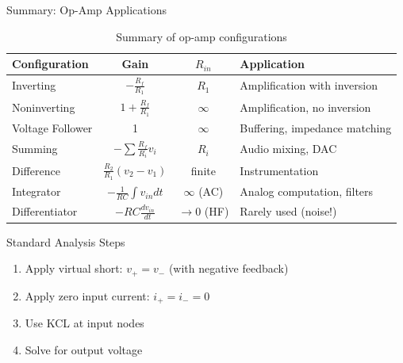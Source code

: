 \documentclass[10pt, aspectratio=169]{beamer}
\begin{document}
\begin{frame}{Summary:  Op-Amp Applications}
    
    \begin{table}
    \centering
    \small
    \begin{tabular}{|l|c|c|l|}
    \hline
    \textbf{Configuration} & \textbf{Gain} & \textbf{$R_{in}$} & \textbf{Application} \\
    \hline
    Inverting & $-\frac{R_f}{R_1}$ & $R_1$ & Amplification with inversion \\
    \hline
    Noninverting & $1 + \frac{R_f}{R_1}$ & $\infty$ & Amplification, no inversion \\
    \hline
    Voltage Follower & 1 & $\infty$ & Buffering, impedance matching \\
    \hline
    Summing & $-\sum \frac{R_f}{R_i}v_i$ & $R_i$ & Audio mixing, DAC \\
    \hline
    Difference & $\frac{R_2}{R_1}(v_2-v_1)$ & finite & Instrumentation \\
    \hline
    Integrator & $-\frac{1}{RC}\int v_{in} dt$ & $\infty$ (AC) & Analog computation, filters \\
    \hline
    Differentiator & $-RC \frac{dv_{in}}{dt}$ & $\to 0$ (HF) & Rarely used (noise!) \\
    \hline
    \end{tabular}
    \caption{Summary of op-amp configurations}
    \end{table}

    \vspace{-0.5cm}

    \begin{block}{Standard Analysis Steps}
        \begin{enumerate}
            \item Apply virtual short:  $v_+ = v_-$ (with negative feedback)
            \item Apply zero input current:  $i_+ = i_- = 0$
            \item Use KCL at input nodes
            \item Solve for output voltage
        \end{enumerate}
    \end{block}
    
\end{frame}
\end{document}
